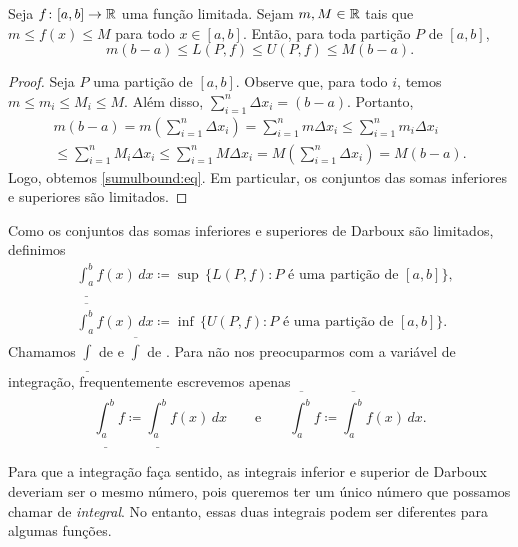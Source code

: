 \begin{prop} \label{sumulbound:prop}
Seja $f \colon [a,b] \to {\mathbb{R}}$ uma função limitada. Sejam $m, M \in {\mathbb{R}}$
tais que $m \leq f(x) \leq M$ para todo $x \in [a,b]$. Então, para toda
partição $P$ de $[a,b]$,
\begin{equation}
\label{sumulbound:eq}
m(b-a) \leq
L(P,f) \leq U(P,f)
\leq M(b-a) .
\end{equation}
\end{prop}

\begin{proof}
Seja $P$ uma partição de $[a,b]$. Observe que, para todo $i$,
temos $m \leq m_i \leq M_i \leq M$. Além disso,
$\sum_{i=1}^n \Delta x_i = (b-a)$. Portanto,
\begin{multline*}
m(b-a) =
m \left( \sum_{i=1}^n \Delta x_i \right)
=
\sum_{i=1}^n m \Delta x_i
\leq
\sum_{i=1}^n m_i \Delta x_i 
\\
\leq
\sum_{i=1}^n M_i \Delta x_i
\leq
\sum_{i=1}^n M \Delta x_i 
=
M \left( \sum_{i=1}^n \Delta x_i \right)
=
M(b-a) .
\end{multline*}
Logo, obtemos \eqref{sumulbound:eq}. Em particular, os conjuntos das somas
inferiores e superiores são limitados.
\end{proof}

\begin{defn}
Como os conjuntos das somas inferiores e superiores de Darboux são limitados,
definimos
\begin{align*}
& \underline{\int_a^b} f(x)\,dx \coloneqq
\sup \, \bigl\{ L(P,f) : P \text{ é uma partição de } [a,b] \bigr\} , \\
& \overline{\int_a^b} f(x)\,dx \coloneqq
\inf \, \bigl\{ U(P,f) : P \text{ é uma partição de } [a,b] \bigr\} .
\end{align*}
Chamamos $\underline{\int}$
de \emph{} e
$\overline{\int}$ de
\emph{}.
Para não nos preocuparmos com a variável de integração,
frequentemente escrevemos apenas
\begin{equation*}
\underline{\int_a^b} f \coloneqq
\underline{\int_a^b} f(x)\,dx 
\qquad \text{e} \qquad
\overline{\int_a^b} f \coloneqq
\overline{\int_a^b} f(x)\,dx  .
\end{equation*}
\end{defn}

Para que a integração faça sentido, as integrais inferior e superior de
Darboux deveriam ser o mesmo número, pois queremos ter um único número que
possamos chamar de \emph{integral}. No entanto, essas duas integrais podem ser
diferentes para algumas funções.

